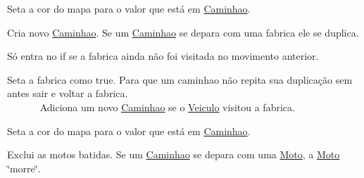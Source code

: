 Seta a cor do mapa para o valor que está em \mbox{\hyperlink{class_caminhao}{Caminhao}}.

Cria novo \mbox{\hyperlink{class_caminhao}{Caminhao}}. Se um \mbox{\hyperlink{class_caminhao}{Caminhao}} se depara com uma fabrica ele se duplica.

Só entra no if se a fabrica ainda não foi visitada no movimento anterior.

Seta a fabrica como true. Para que um caminhao não repita sua duplicação sem antes sair e voltar a fabrica. ~\newline
~\newline
~\newline
~\newline
~\newline
~\newline
~\newline
~\newline
~\newline
~\newline
~\newline
~\newline
~\newline
~\newline
~\newline
~\newline
~\newline
~\newline
~\newline
~\newline
~\newline
~\newline
~\newline
~\newline
~\newline
~\newline
~\newline
~\newline
~\newline
~\newline
~\newline
~\newline
 Adiciona um novo \mbox{\hyperlink{class_caminhao}{Caminhao}} se o \mbox{\hyperlink{class_veiculo}{Veiculo}} visitou a fabrica.

Seta a cor do mapa para o valor que está em \mbox{\hyperlink{class_caminhao}{Caminhao}}.

Exclui as motos batidas. Se um \mbox{\hyperlink{class_caminhao}{Caminhao}} se depara com uma \mbox{\hyperlink{class_moto}{Moto}}, a \mbox{\hyperlink{class_moto}{Moto}} \char`\"{}morre\char`\"{}.

